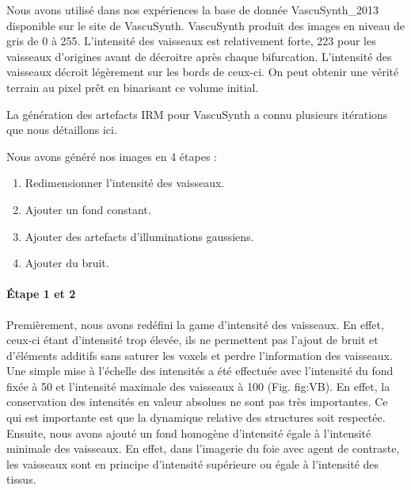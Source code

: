 Nous avons utilisé dans nos expériences la base de donnée VascuSynth\_2013 disponible sur le site de VascuSynth. VascuSynth produit des images en niveau de gris de 0 à 255. L'intensité des vaisseaux est relativement forte, 223 pour les vaisseaux d'origines avant de décroitre après chaque bifurcation. L'intensité des vaisseaux décroit légèrement sur les bords de ceux-ci. On peut obtenir une vérité terrain au pixel prêt en binarisant ce volume initial.

La génération des artefacts IRM pour VascuSynth a connu plusieurs itérations que nous détaillons ici.

Nous avons généré nos images en 4 étapes :
\begin{enumerate}
\item Redimensionner l'intensité des vaisseaux.
\item Ajouter un fond constant. 
\item Ajouter des artefacts d'illuminations gaussiens.
\item Ajouter du bruit.
\end{enumerate}

\paragraph{Étape 1 et 2}
Premièrement, nous avons redéfini la game d'intensité des vaisseaux. En effet, ceux-ci étant d'intensité trop élevée, ils ne permettent pas l'ajout de bruit et d'éléments additifs sans saturer les voxels et perdre l'information des vaisseaux. Une simple mise à l'échelle des intensités a été effectuée avec l'intensité du fond fixée à 50 et l'intensité maximale des vaisseaux à 100 (Fig. {fig:VB}). En effet, la conservation des intensités en valeur absolues ne sont pas très importantes. Ce qui est importante est que la dynamique relative des structures soit respectée. Ensuite, nous avons ajouté un fond homogène d'intensité égale à l'intensité minimale des vaisseaux. En effet, dans l'imagerie du foie avec agent de contraste, les vaisseaux sont en principe d'intensité supérieure ou égale à l'intensité des tissus.

